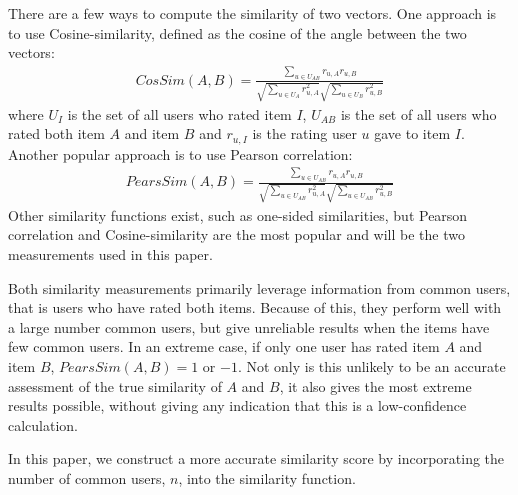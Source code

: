 \documentclass[10pt]{article}
\begin{document}
There are a few ways to compute the similarity of two vectors. One approach is
to use Cosine-similarity, defined as the cosine of the angle between the two vectors:
\begin{align}
CosSim(A, B) = \frac{\sum\limits_{u\in U_{AB}}
r_{u,A}r_{u,B}}{\sqrt{\sum\limits_{u\in U_{A}} r_{u,A}^2}
\sqrt{\sum\limits_{u\in U_{B}} r_{u,B}^2}}
\end{align}
where $U_{I}$ is the set of all users who rated item $I$, $U_{AB}$ is the set of all 
users who rated both item $A$ and item $B$ and $r_{u,I}$ is the rating user $u$ gave 
to item $I$. Another popular approach is to use Pearson correlation:
\begin{align}
PearsSim(A, B) = \frac{\sum\limits_{u\in U_{AB}}
r_{u,A}r_{u,B}}{\sqrt{\sum\limits_{u\in U_{AB}} r_{u,A}^2}
\sqrt{\sum\limits_{u\in U_{AB}} r_{u,B}^2}}
\end{align}
Other similarity functions exist, such as one-sided similarities, but Pearson
correlation and Cosine-similarity are the most popular and will be the two
measurements used in this paper. \footnotemark


Both similarity measurements primarily leverage information from common users,
that is users who have rated both items. Because of this, they perform
well with a large number common users, but give unreliable results when the
items have few common users. In an extreme case, if only one user has rated item
$A$ and item $B$, $PearsSim(A, B) = 1$ or $-1$. Not only is this unlikely to be an accurate
assessment of the true similarity of $A$ and $B$, it also gives the most extreme
results possible, without giving any indication that this is a low-confidence
calculation.

In this paper, we construct a more accurate similarity score by incorporating the
number of common users, $n$, into the similarity function. 
\end{document}
